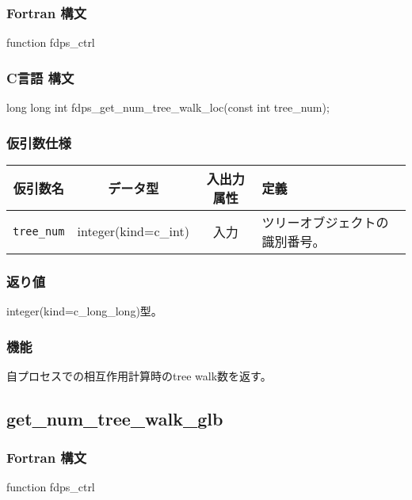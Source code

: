 \subsubsection*{Fortran 構文}
\begin{screen}
\begin{spverbatim}
function fdps_ctrl%
\end{spverbatim}
\end{screen}

\subsubsection*{C言語 構文}
\begin{screen}
\begin{spverbatim}
long long int fdps_get_num_tree_walk_loc(const int tree_num);
\end{spverbatim}
\end{screen}


\subsubsection*{仮引数仕様}
\begin{table}[h]
\begin{tabularx}{\linewidth}{cccX}
\toprule
\rowcolor{Snow2}
仮引数名 & データ型 & 入出力属性 & 定義 \\
\midrule
\verb|tree_num|  & integer(kind=c\_int)   & 入力     & ツリーオブジェクトの識別番号。\\
\bottomrule
\end{tabularx}
\end{table}

\subsubsection*{返り値}
integer(kind=c\_long\_long)型。

\subsubsection*{機能}
自プロセスでの相互作用計算時のtree walk数を返す。
\clearpage

\subsection{get\_num\_tree\_walk\_glb}
\subsubsection*{Fortran 構文}
\begin{screen}
\begin{spverbatim}
function fdps_ctrl%
\end{spverbatim}
\end{screen}

